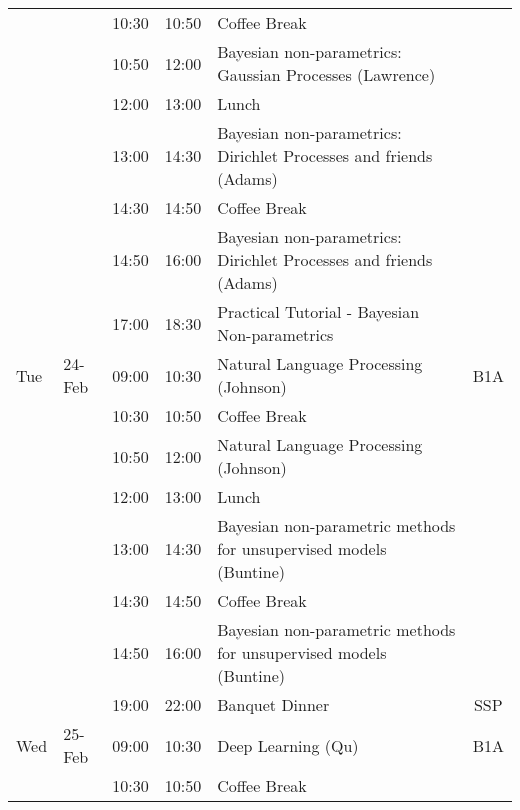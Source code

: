 \begin{longtable}{  p{0.5cm} l l l p{9cm}  c    }
    &        & 10:30 & 10:50 & Coffee Break                                                      &                   \\
    &        & 10:50 & 12:00 & Bayesian non-parametrics: Gaussian Processes (Lawrence)           &                   \\
    &        & 12:00 & 13:00 & Lunch                                                             &                   \\
    &        & 13:00 & 14:30 & Bayesian non-parametrics: Dirichlet Processes and friends (Adams) &                   \\
    &        & 14:30 & 14:50 & Coffee Break                                                      &                   \\
    &        & 14:50 & 16:00 & Bayesian non-parametrics: Dirichlet Processes and friends (Adams) &                   \\
    &        & 17:00 & 18:30 & Practical Tutorial  - Bayesian Non-parametrics                   &                   \\
    \midrule
Tue & 24-Feb & 09:00 & 10:30 & Natural Language Processing (Johnson)                             &B1A \\
    &        & 10:30 & 10:50 & Coffee Break                                                      &                   \\
    &        & 10:50 & 12:00 & Natural Language Processing (Johnson)                             &                   \\
    &        & 12:00 & 13:00 & Lunch                                                             &                   \\
    &        & 13:00 & 14:30 & Bayesian non-parametric methods for unsupervised models (Buntine) &                   \\
    &        & 14:30 & 14:50 & Coffee Break                                                      &                   \\
    &        & 14:50 & 16:00 & Bayesian non-parametric methods for unsupervised models (Buntine) &                   \\
    &        & 19:00 & 22:00 & Banquet Dinner                                                    & SSP   \\
    \midrule
Wed & 25-Feb & 09:00 & 10:30 & Deep Learning (Qu)                                                &B1A \\
    &        & 10:30 & 10:50 & Coffee Break                                                      &                   \\

\end{longtable}
